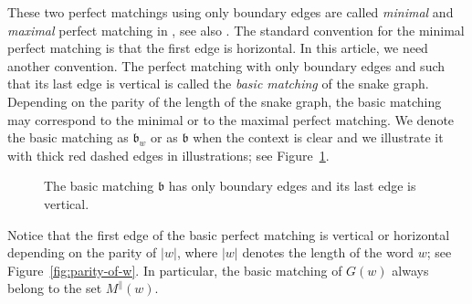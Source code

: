 \documentclass[a4paper,12pt]{amsart}
\newcommand{\bfrak}{{\mathfrak{b}}}
\newcommand{\0}{\mathtt{0}}
\newcommand{\1}{\mathtt{1}}
\newcommand{\2}{\mathtt{2}}
\newcommand{\3}{\mathtt{3}}
\newcommand{\carrevide}{{\parallel}}
\begin{document}
These two perfect matchings using only boundary edges are called \emph{minimal}
and \emph{maximal} perfect matching in
\cite{MR3034481,MR2661414,zbMATH06144657}, see also \cite{zbMATH08015631}.
The standard convention for the minimal perfect matching is that
the first edge is horizontal.
In this article, we need another convention.
The perfect matching with only boundary edges and such that its last edge is
vertical is called the \emph{basic matching} of the snake graph.
Depending on the parity of the length of the snake graph, the basic matching may
correspond to the minimal or to the maximal perfect matching.
We denote the basic matching as $\bfrak_w$ or as $\bfrak$ when the context is clear
and we illustrate it with thick red dashed edges in illustrations;
see Figure~\ref{fig:the-basic-matching}.

\begin{figure}[h]
\begin{center}
\end{center}
    \caption{The basic matching $\bfrak$ has only boundary edges
    and its last edge is vertical.}
    \label{fig:the-basic-matching}
\end{figure}


Notice that the first edge of the basic perfect matching is vertical
or horizontal depending on the parity of $|w|$, where $|w|$ denotes
the length of the word $w$; see Figure~\ref{fig:parity-of-w}.
In particular, the basic matching of $G(w)$ always belong to the set $M^\carrevide(w)$.
\end{document}

